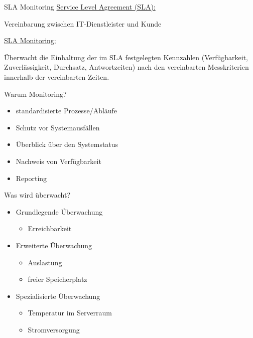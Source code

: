 \documentclass[12pt]{beamer}              %
\begin{document}
\begin{frame}{SLA Monitoring}
	\underline{Service Level Agreement (SLA):}\medskip
	
	Vereinbarung zwischen IT-Dienstleister und Kunde\bigskip
	
	\underline{SLA Monitoring:}\medskip
	
	Überwacht die Einhaltung der im SLA festgelegten Kennzahlen (Verfügbarkeit, Zuverlässigkeit, Durchsatz, Antwortzeiten) nach den vereinbarten Messkriterien innerhalb der vereinbarten Zeiten.
\end{frame}
\begin{frame}{Warum Monitoring?}
	\begin{itemize}
		\item standardisierte Prozesse/Abläufe
		\item Schutz vor Systemausfällen
		\item Überblick über den Systemstatus
		\item Nachweis von Verfügbarkeit
		\item Reporting
	\end{itemize}
\end{frame}
\begin{frame}{Was wird überwacht?}
	\begin{center}
		\begin{itemize}
			\item Grundlegende Überwachung
			\begin{itemize}
				\item Erreichbarkeit
			\end{itemize}
			\item Erweiterte Überwachung
			\begin{itemize}
				\item Auslastung
				\item freier Speicherplatz
			\end{itemize}
			\item Spezialisierte Überwachung
			\begin{itemize}
				\item Temperatur im Serverraum
				\item Stromversorgung
			\end{itemize}
		\end{itemize}
	\end{center}
	
	
\end{frame}
\end{document}
